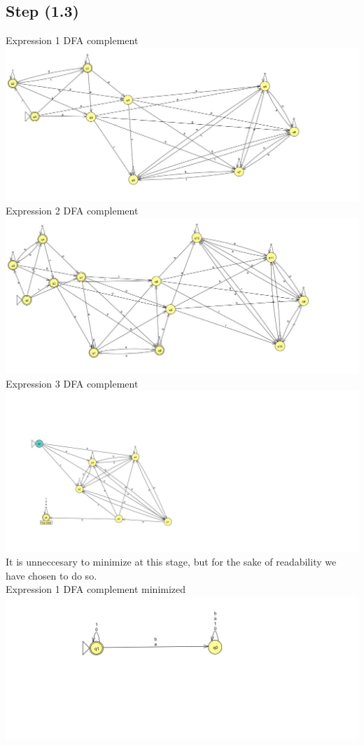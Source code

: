 \documentclass{article}
\theoremstyle{remark}
\numberwithin{equation}{section}
\begin{document}
	\subsection*{Step (1.3)}
	\noindent Expression 1 DFA complement\\
	\includegraphics[width=0.9\columnwidth]{E1_cDFA.jpg}\\
	\noindent Expression 2 DFA complement\\
	\includegraphics[width=0.9\columnwidth]{E2_cDFA.jpg}\\
	\noindent Expression 3 DFA complement\\
	\includegraphics[width=0.9\columnwidth]{E3_cDFA.jpg}\\
	\newpage\noindent It is unneccesary to minimize at this stage, but for the sake of readability we have chosen to do so.\\ Expression 1 DFA complement minimized\\
	\includegraphics[width=\textwidth]{E1_mcDFA.jpg}\\
\end{document}
